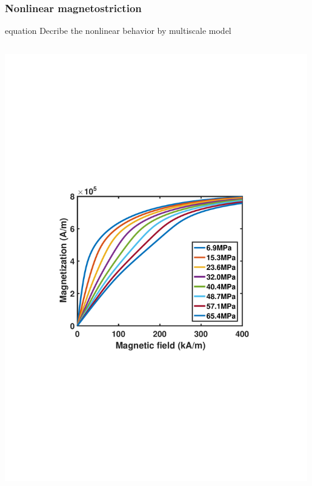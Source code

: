 \documentclass[compress]{beamer}
\begin{document}
\begin{frame}
\begin{columns}[totalwidth=\textwidth]
\begin{column}{.75\textwidth}
	\end{column}
\end{columns}	
\end{frame}

\begin{frame}\frametitle{Nonlinear magnetostriction}
\begin{beamercolorbox}[sep=5pt,center]{equation}
     Decribe the nonlinear behavior by multiscale model
\end{beamercolorbox}
\begin{columns}[totalwidth=\textwidth] 
   \begin{column}{.5\textwidth}
   \includegraphics[width=0.99\textwidth]{Graphic/02_MHterfenol.pdf}

\end{column}
\end{columns}
\end{frame}
\end{document}
